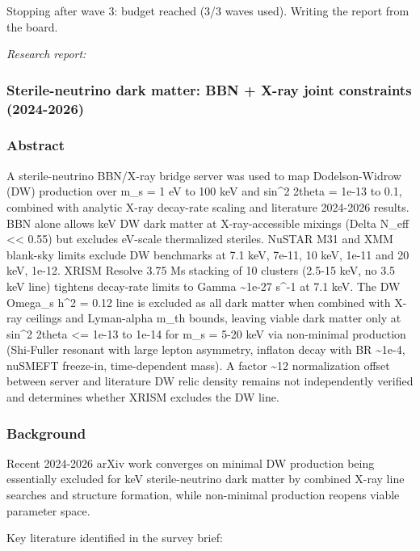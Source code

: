 \documentclass[11pt,a4paper]{article}
\begin{document}
Stopping after wave 3: budget reached (3/3 waves used). Writing the report from the board.

\textit{Research report:}\par
\subsubsection*{Sterile-neutrino dark matter: BBN + X-ray joint constraints (2024-2026)}
\subsubsection*{Abstract}
A sterile-neutrino BBN/X-ray bridge server was used to map Dodelson-Widrow (DW) production over m\_s = 1 eV to 100 keV and sin\textasciicircum{}2 2theta = 1e-13 to 0.1, combined with analytic X-ray decay-rate scaling and literature 2024-2026 results. BBN alone allows keV DW dark matter at X-ray-accessible mixings (Delta N\_eff \textless{}\textless{} 0.55) but excludes eV-scale thermalized steriles. NuSTAR M31 and XMM blank-sky limits exclude DW benchmarks at 7.1 keV, 7e-11, 10 keV, 1e-11 and 20 keV, 1e-12. XRISM Resolve 3.75 Ms stacking of 10 clusters (2.5-15 keV, no 3.5 keV line) tightens decay-rate limits to Gamma \textasciitilde{}1e-27 s\textasciicircum{}-1 at 7.1 keV. The DW Omega\_s h\textasciicircum{}2 = 0.12 line is excluded as all dark matter when combined with X-ray ceilings and Lyman-alpha m\_th bounds, leaving viable dark matter only at sin\textasciicircum{}2 2theta \textless{}= 1e-13 to 1e-14 for m\_s = 5-20 keV via non-minimal production (Shi-Fuller resonant with large lepton asymmetry, inflaton decay with BR \textasciitilde{}1e-4, nuSMEFT freeze-in, time-dependent mass). A factor \textasciitilde{}12 normalization offset between server and literature DW relic density remains not independently verified and determines whether XRISM excludes the DW line.

\subsubsection*{Background}
Recent 2024-2026 arXiv work converges on minimal DW production being essentially excluded for keV sterile-neutrino dark matter by combined X-ray line searches and structure formation, while non-minimal production reopens viable parameter space.

Key literature identified in the survey brief:
\end{document}
